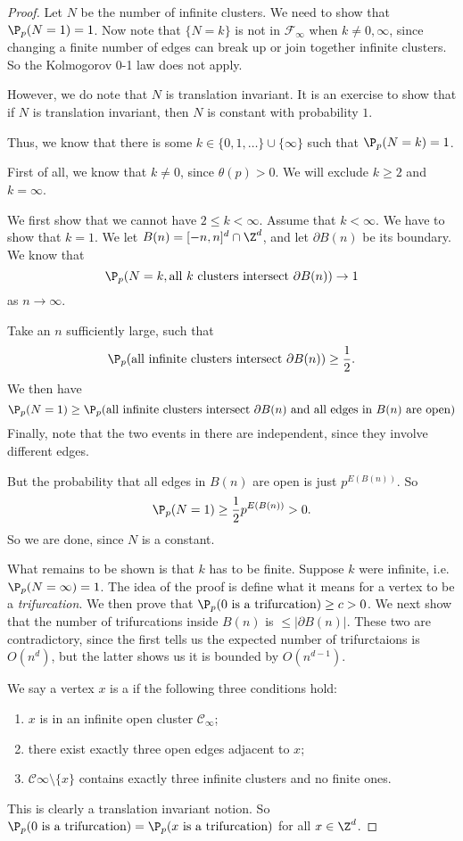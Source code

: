 \documentclass[a4paper]{article}
\begin{document}
\begin{proof}
  Let $N$ be the number of infinite clusters. We need to show that $\P_p(N = 1) = 1$. Now note that $\{N = k\}$ is not in $\mathcal{F}_\infty$ when $k \not= 0, \infty$, since changing a finite number of edges can break up or join together infinite clusters. So the Kolmogorov 0-1 law does not apply.

  However, we do note that $N$ is translation invariant. It is an exercise to show that if $N$ is translation invariant, then $N$ is constant with probability $1$.

  Thus, we know that there is some $k \in \{0, 1, \ldots\} \cup \{\infty\}$ such that $\P_p(N = k) = 1$.

  First of all, we know that $k \not= 0$, since $\theta(p) > 0$. We will exclude $k \geq 2$ and $k = \infty$.

  We first show that we cannot have $2 \leq k < \infty$. Assume that $k < \infty$. We have to show that $k = 1$. We let $B(n) = [-n, n]^d \cap \Z^d$, and let $\partial B(n)$ be its boundary. We know that
  \[
    \P_p(N = k, \text{all $k$ clusters intersect $\partial B(n)$}) \to 1
  \]
  as $n \to \infty$.

  Take an $n$ sufficiently large, such that
  \[
    \P_p(\text{all infinite clusters intersect }\partial B(n)) \geq \frac{1}{2}.
  \]
  We then have
  \[
    \P_p(N = 1) \geq \P_p(\text{all infinite clusters intersect }\partial B(n)\text{ and all edges in $B(n)$ are open})
  \]
  Finally, note that the two events in there are independent, since they involve different edges.

  But the probability that all edges in $B(n)$ are open is just $p^{E(B(n))}$. So
  \[
    \P_p(N = 1) \geq \frac{1}{2} p^{E(B(n))} > 0.
  \]
  So we are done, since $N$ is a constant.

  What remains to be shown is that $k$ has to be finite. Suppose $k$ were infinite, i.e.\ $\P_p(N = \infty) = 1$. The idea of the proof is define what it means for a vertex to be a \emph{trifurcation}. We then prove that $\P_p(0\text{ is a trifurcation}) \geq c > 0$. We next show that the number of trifurcations inside $B(n)$ is $\leq |\partial B(n)|$. These two are contradictory, since the first tells us the expected number of trifurctaions is $O(n^d)$, but the latter shows us it is bounded by $O(n^{d - 1})$.

  We say a vertex $x$ is a  if the following three conditions hold:
  \begin{enumerate}
    \item $x$ is in an infinite open cluster $\mathcal{C}_\infty$;
    \item there exist exactly three open edges adjacent to $x$;
    \item $\mathcal{C} \infty \setminus \{x\}$ contains exactly three infinite clusters and no finite ones.
  \end{enumerate}
  This is clearly a translation invariant notion. So $\P_p(0 \text{ is a trifurcation}) = \P_p(x \text{ is a trifurcation})$ for all $x \in \Z^d$.


\end{proof}
\end{document}
